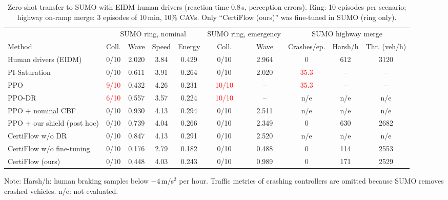 \begin{table}[t]
\caption{Zero-shot transfer to SUMO with EIDM human drivers (reaction time 0.8\,s, perception errors). Ring: 10 episodes per scenario; highway on-ramp merge: 3 episodes of 10\,min, 10\% CAVs. Only ``CertiFlow (ours)'' was fine-tuned in SUMO (ring only).}\label{tab:sumo}
\centering\footnotesize
\begin{tabular*}{\textwidth}{@{\extracolsep{\fill}}l cccc cc ccc@{}}
\toprule
 & \multicolumn{4}{c}{SUMO ring, nominal} & \multicolumn{2}{c}{SUMO ring, emergency} & \multicolumn{3}{c}{SUMO highway merge}\\
\cmidrule(lr){2-5}\cmidrule(lr){6-7}\cmidrule(l){8-10}
Method & Coll. & Wave & Speed & Energy & Coll. & Wave & Crashes/ep. & Harsh/h & Thr. (veh/h)\\
\midrule
Human drivers (EIDM) & 0/10 & 2.020 & 3.84 & 0.429 & 0/10 & 2.964 & 0 & 612 & 3120\\
PI-Saturation & 0/10 & 0.611 & 3.91 & 0.264 & 0/10 & 2.020 & \textcolor{red}{35.3} & -- & --\\
PPO & \textcolor{red}{9/10} & 0.432 & 4.26 & 0.231 & \textcolor{red}{10/10} & -- & \textcolor{red}{35.3} & -- & --\\
PPO-DR & \textcolor{red}{6/10} & 0.557 & 3.57 & 0.224 & \textcolor{red}{10/10} & -- & n/e & n/e & n/e\\
PPO + nominal CBF & 0/10 & 0.930 & 4.13 & 0.294 & 0/10 & 2.511 & n/e & n/e & n/e\\
PPO + our shield (post hoc) & 0/10 & 0.739 & 4.04 & 0.266 & 0/10 & 2.349 & 0 & 630 & 2682\\
CertiFlow w/o DR & 0/10 & 0.847 & 4.13 & 0.291 & 0/10 & 2.520 & n/e & n/e & n/e\\
CertiFlow w/o fine-tuning & 0/10 & 0.176 & 2.79 & 0.182 & 0/10 & 0.488 & 0 & 114 & 2553\\
CertiFlow (ours) & 0/10 & 0.448 & 4.03 & 0.243 & 0/10 & 0.989 & 0 & 171 & 2529\\
\bottomrule
\end{tabular*}
\par\smallskip\raggedright\scriptsize Note: Harsh/h: human braking samples below $-4$\,m/s$^2$ per hour. Traffic metrics of crashing controllers are omitted because SUMO removes crashed vehicles. n/e: not evaluated.
\end{table}
